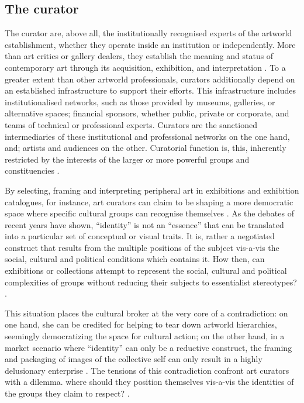 \subsection{The curator}
The curator are, above all, the institutionally recognised experts of the artworld establishment, whether they operate inside an institution or independently. More than art critics or gallery dealers, they establish the meaning and status of contemporary art through its acquisition, exhibition, and interpretation \autocite[p. 22]{Thi_book}. To a greater extent than other artworld professionals, curators additionally depend on an established infrastructure to support their efforts. This infrastructure includes institutionalised networks, such as those provided by museums, galleries, or alternative spaces; financial sponsors, whether public, private or corporate, and teams of technical or professional experts. Curators are the sanctioned intermediaries of these institutional and professional networks on the one hand, and; artists and audiences on the other. Curatorial function is, this, inherently restricted by the interests of the larger or more powerful groups and constituencies \autocite[p. 22]{Thi_book}.

By selecting, framing and interpreting peripheral art in exhibitions and exhibition catalogues, for instance, art curators can claim to be shaping a more democratic space where specific cultural groups can recognise themselves \autocite[p. 23]{Thi_book}. As the debates of recent years have shown, “identity” is not an “essence” that can be translated into a particular set of conceptual or visual traits. It is, rather a negotiated construct that results from the multiple positions of the subject vis-a-vis the social, cultural and political conditions which contains it. How then, can exhibitions or collections attempt to represent the social, cultural and political complexities of groups without reducing their subjects to essentialist stereotypes? \autocite[p. 23]{Thi_book}.

This situation places the cultural broker at the very core of a contradiction: on one hand, she can be credited for helping to tear down artworld hierarchies, seemingly democratizing the space for cultural action; on the other hand, in a market scenario where “identity” can only be a reductive construct, the framing and packaging of images of the collective self can only result in a highly delusionary enterprise \autocite[p. 23-24]{Thi_book}. The tensions of this contradiction confront art curators with a dilemma. where should they position themselves vis-a-vis the identities of the groups they claim to respect? \autocite[p. 24]{Thi_book}.


